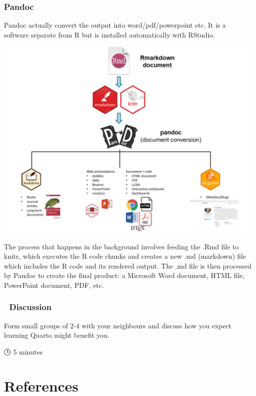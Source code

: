 \documentclass[
  letterpaper,
  DIV=11,
  numbers=noendperiod,
  oneside]{scrreprt}
\begin{document}
\hypertarget{pandoc}{%
\subsubsection{Pandoc}\label{pandoc}}

Pandoc actually convert the output into word/pdf/powerpoint etc. It is a
software separate from R but is installed automatically with RStudio.

\includegraphics{./images/paste-ABFB521E.png}

The process that happens in the background involves feeding the .Rmd
file to knitr, which executes the R code chunks and creates a new .md
(markdown) file which includes the R code and its rendered output. The
.md file is then processed by Pandoc to create the final product: a
Microsoft Word document, HTML file, PowerPoint document, PDF, etc.

\hypertarget{discussion-1}{%
\subsubsection{\texorpdfstring{{💬}
Discussion}{💬 Discussion}}\label{discussion-1}}

Form small groups of 2-4 with your neighbours and discuss how you expect
learning Quarto might benefit you.

{🕒} 5 minutes

\hypertarget{references}{%
\section{References}\label{references}}
\end{document}
